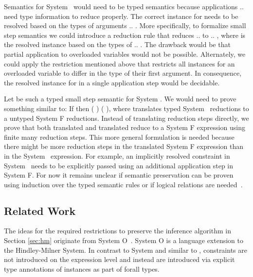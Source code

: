 \noindent Semantics for System \Fo\ would need to be typed semantics because applications      $..$   need type information to reduce properly.
The correct instance for  needs to be resolved based on the types of arguments  $..$ . 
More specifically, to formalize small step semantics we could introduce a reduction rule  that reduces      $..$   to     $..$  , where  is the resolved instance based on the types of  $..$ . The drawback would be that partial application to overloaded variables would not be possible.
Alternately, we could apply the restriction mentioned above that restricts all instances for an overloaded variable  to differ in the type of their first argument.
In consequence, the resolved instance for  in a single application step     would be decidable.

\noindent Let    be such a typed small step semantic for System \Fo. 
We would need to prove something similar to: If    then  \Constr{[}  \Constr{]} (   )  (   ), where  translates typed System \Fo\ reductions to a untyped System F reductions.
Instead of translating reduction steps directly, we prove that both translated  and translated  reduce to a System F expression  using finite many reduction steps.
This more general formulation is needed because there might be more reduction steps in the translated System F expression than in the System \Fo\ expression. 
For example, an implicitly resolved constraint in System \Fo\ needs to be explicitly passed using an additional application step in System F. 
For now it remains unclear if semantic preservation can be proven using induction over the typed semantic rules or if logical relations are needed~\cite{logrel}.

\subsection{Related Work}
The ideas for the required restrictions to preserve the inference algorithm in Section \ref{sec:hm} originate from System O~\cite{syso}. 
System O is a language extension to the Hindley-Milner System. 
In contrast to System \Fo and similar to \HMo, constraints are not introduced on the expression level and instead are introduced via explicit type annotations of instances as part of forall types. 

